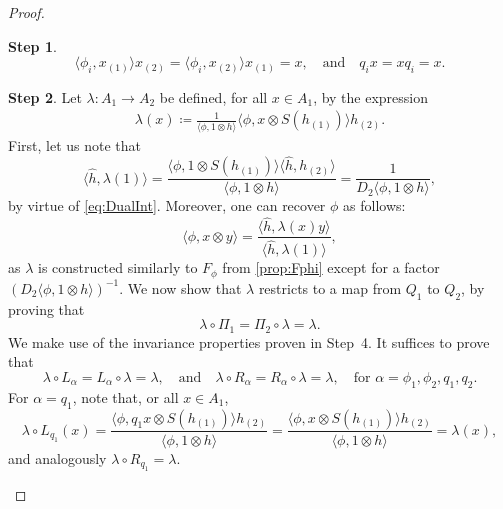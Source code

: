 \documentclass[a4paper,10pt]{amsart}
\newcommand{\eval}[2]{\langle #1 , #2\rangle}
\theoremstyle{definition}
\newtheorem{step-goursat}{Step}
\begin{document}
\begin{proof}
\begin{step-goursat}
\begin{equation}
        \eval{\phi_i}{x_{(1)}}x_{(2)}
            =
            \eval{\phi_i}{x_{(2)}} x_{(1)}
            =
            x,
        \quad\text{and}\quad
        q_i x = x q_i = x.
    \end{equation}
    \end{step-goursat}
    \begin{step-goursat}
    Let $\lambda:A_1\to A_{2}$ be defined, for all $x\in A_1$, by the expression
    \begin{align*}
        \lambda(x)
        \coloneqq
        \frac{1}{\eval{\phi}{1 \otimes h}}
        \eval{\phi}{x \otimes S(h_{(1)})} h_{(2)}.
    \end{align*}
    First, let us note that 
    \begin{equation}\label{eq:normalizationVarPhi}
        \eval{\hat{h}}{\lambda(1)}
        =
        \frac{\eval{\phi}{1\otimes S(h_{(1)})} \eval{\hat{h}}{h_{(2)}}}{\eval{\phi}{1\otimes h}}
        =
        \frac{1}{D_2\eval{\phi}{1\otimes h}},
    \end{equation}
    by virtue of \cref{eq:DualInt}.
    Moreover, one can recover $\phi$ as follows:
    \begin{equation}
    \eval{\phi}{x\otimes y}
    =
    \frac{\eval{\hat{h}}{\lambda (x)y}}{\eval{\hat{h}}{\lambda(1)}},
    \end{equation}
    as $\lambda$ is constructed similarly to $F_\phi$ from \cref{prop:Fphi} except for a factor $(D_2 \eval{\phi}{1\otimes h})^{-1}$.
    \smallbreak\noindent%
    We now show that $\lambda$ restricts to a map from $Q_1$ to $Q_2$, by proving that
    \begin{equation}\label{eq:lambdaPii}
        \lambda \circ \Pi_1
        =
        \Pi_2 \circ \lambda
        =
        \lambda.
    \end{equation}
    We make use of the invariance properties proven in Step~4.
    It suffices to prove that
    \[
        \lambda \circ L_\alpha
        =
        L_\alpha \circ \lambda
        =
        \lambda
        ,\quad\text{and}\quad
        \lambda\circ R_\alpha
        =
        R_\alpha\circ \lambda
        =
        \lambda
        ,\quad\text{for }
        \alpha = \phi_1,\phi_2, q_1, q_2.
    \]
    For $\alpha = q_1$, note that, or all $x\in A_1$,
    \[
        \lambda \circ L_{q_1}(x) = \frac{\eval{\phi}{q_1x \otimes S(h_{(1)})}h_{(2)}}{\eval{\phi}{1\otimes h}} = \frac{\eval{\phi}{x \otimes S(h_{(1)})} h_{(2)}}{\eval{\phi}{1\otimes h}} = \lambda(x),
    \]
    and analogously $\lambda \circ R_{q_1} = \lambda$.

\end{step-goursat}
\end{proof}
\end{document}
